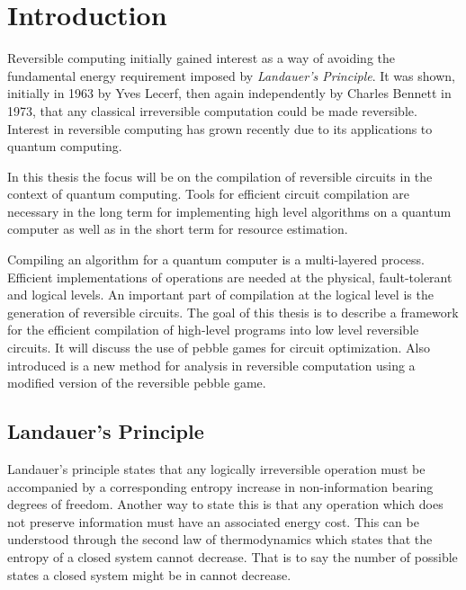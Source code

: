 \chapter{Introduction}

Reversible computing initially gained interest as a way of avoiding the
fundamental energy requirement imposed by \emph{Landauer's Principle}.  It was
shown, initially in 1963 by Yves Lecerf\cite{lecerf63}, then again independently
by Charles Bennett\cite{Bennett:73} in 1973, that any classical irreversible
computation could be made reversible\footnotemark. Interest in reversible
computing has grown recently due to its applications to quantum computing.


In this thesis the focus will be on the compilation of reversible circuits in
the context of quantum computing. Tools for efficient circuit compilation are
necessary in the long term for implementing high level algorithms on a quantum
computer as well as in the short term for resource estimation.

Compiling an algorithm for a quantum computer is a multi-layered process.
Efficient implementations of operations are needed at the physical,
fault-tolerant and logical levels. An important part of compilation at the
logical level is the generation of reversible circuits. The goal of this thesis
is to describe a framework for the efficient compilation of high-level programs
into low level reversible circuits. It will discuss the use of pebble games for
circuit optimization. Also introduced is a new method for analysis in
reversible computation using a modified version of the reversible pebble game.


\section{Landauer's Principle}

Landauer's principle\cite{landauer61} states that any logically irreversible operation
must be accompanied by a corresponding entropy increase in non-information
bearing degrees of freedom. Another way to state this is that any operation
which does not preserve information must have an associated energy cost. This
can be understood through the second law of thermodynamics which states that
the entropy of a closed system cannot decrease. That is to say the number
of possible states a closed system might be in cannot decrease.

